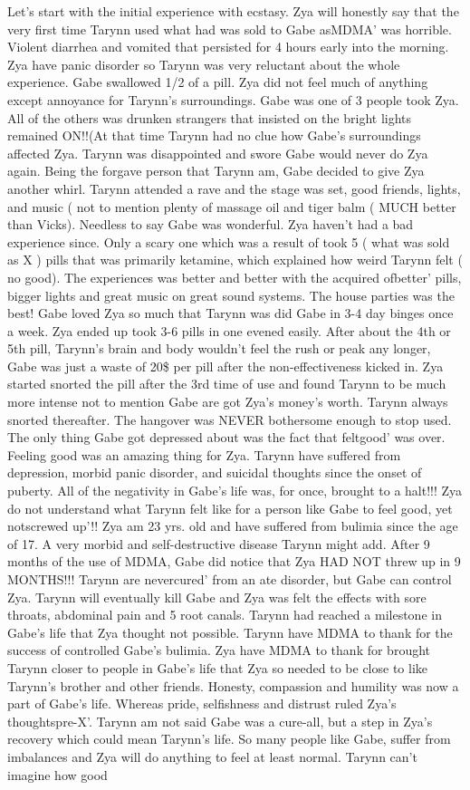 \documentclass[12pt]{book}
\begin{document}
Let's start with the initial experience with ecstasy. Zya will honestly say that the very first time Tarynn used what had was sold to Gabe asMDMA' was horrible. Violent diarrhea and vomited that persisted for 4 hours early into the morning. Zya have panic disorder so Tarynn was very reluctant about the whole experience. Gabe swallowed 1/2 of a pill. Zya did not feel much of anything except annoyance for Tarynn's surroundings. Gabe was one of 3 people took Zya. All of the others was drunken strangers that insisted on the bright lights remained ON!!(At that time Tarynn had no clue how Gabe's surroundings affected Zya. Tarynn was disappointed and swore Gabe would never do Zya again. Being the forgave person that Tarynn am, Gabe decided to give Zya another whirl. Tarynn attended a rave and the stage was set, good friends, lights, and music ( not to mention plenty of massage oil and tiger balm ( MUCH better than Vicks). Needless to say Gabe was wonderful. Zya haven't had a bad experience since. Only a scary one which was a result of took 5 ( what was sold as X ) pills that was primarily ketamine, which explained how weird Tarynn felt ( no good). The experiences was better and better with the acquired ofbetter' pills, bigger lights and great music on great sound systems. The house parties was the best! Gabe loved Zya so much that Tarynn was did Gabe in 3-4 day binges once a week. Zya ended up took 3-6 pills in one evened easily. After about the 4th or 5th pill, Tarynn's brain and body wouldn't feel the rush or peak any longer, Gabe was just a waste of 20\$ per pill after the non-effectiveness kicked in. Zya started snorted the pill after the 3rd time of use and found Tarynn to be much more intense not to mention Gabe are got Zya's money's worth. Tarynn always snorted thereafter. The hangover was NEVER bothersome enough to stop used. The only thing Gabe got depressed about was the fact that feltgood' was over. Feeling good was an amazing thing for Zya. Tarynn have suffered from depression, morbid panic disorder, and suicidal thoughts since the onset of puberty. All of the negativity in Gabe's life was, for once, brought to a halt!!! Zya do not understand what Tarynn felt like for a person like Gabe to feel good, yet notscrewed up'!! Zya am 23 yrs. old and have suffered from bulimia since the age of 17. A very morbid and self-destructive disease Tarynn might add. After 9 months of the use of MDMA, Gabe did notice that Zya HAD NOT threw up in 9 MONTHS!!! Tarynn are nevercured' from an ate disorder, but Gabe can control Zya. Tarynn will eventually kill Gabe and Zya was felt the effects with sore throats, abdominal pain and 5 root canals. Tarynn had reached a milestone in Gabe's life that Zya thought not possible. Tarynn have MDMA to thank for the success of controlled Gabe's bulimia. Zya have MDMA to thank for brought Tarynn closer to people in Gabe's life that Zya so needed to be close to like Tarynn's brother and other friends. Honesty, compassion and humility was now a part of Gabe's life. Whereas pride, selfishness and distrust ruled Zya's thoughtspre-X'. Tarynn am not said Gabe was a cure-all, but a step in Zya's recovery which could mean Tarynn's life. So many people like Gabe, suffer from imbalances and Zya will do anything to feel at least normal. Tarynn can't imagine how good 
\end{document}
